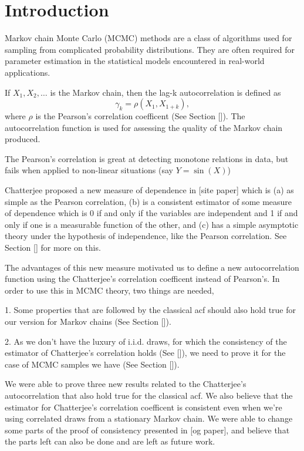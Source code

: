 \chapter{Introduction}

Markov chain Monte Carlo (MCMC) methods are a class of algorithms used for sampling from complicated probability distributions.
They are often required for parameter estimation in the statistical models encountered in real-world applications.

If $X_1, X_2, \dots$ is the Markov chain,
then the lag-k autocorrelation is defined as
$$\gamma_k = \rho(X_1, X_{1+k}),$$
where $\rho$ is the Pearson's correlation coefficent (See Section []).
The autocorrelation function is used for assessing the quality of the Markov chain produced.

The Pearson's correlation is great at detecting monotone relations in data,
but fails when applied to non-linear situations (say $Y = \sin(X)$)

Chatterjee proposed a new measure of dependence in [site paper] which is
(a) as simple as the Pearson correlation,
(b) is a consistent estimator of some measure of dependence which is 0 if and only if the variables are independent and 1 if and only if one is a measurable function of the other, and
(c) has a simple asymptotic theory under the hypothesis of independence, like the Pearson correlation.
See Section [] for more on this.

The advantages of this new measure motivated us to define a new autocorrelation function using the Chatterjee's correlation coefficent instead of Pearson's.
In order to use this in MCMC theory, two things are needed,

1. Some properties that are followed by the classical acf should also hold true for our version for Markov chains (See Section []).

2. As we don't have the luxury of i.i.d. draws, for which the consistency of the estimator of Chatterjee's correlation holds (See []),
	we need to prove it for the case of MCMC samples we have (See Section []).

We were able to prove three new results related to the Chatterjee's autocorrelation that also hold true for the classical acf.
We also believe that the estimator for Chatterjee's correlation coefficent is consistent even when we're using correlated draws from a stationary Markov chain.
We were able to change some parts of the proof of consistency presented in [og paper], and believe that the parts left can also be done and are left as future work.